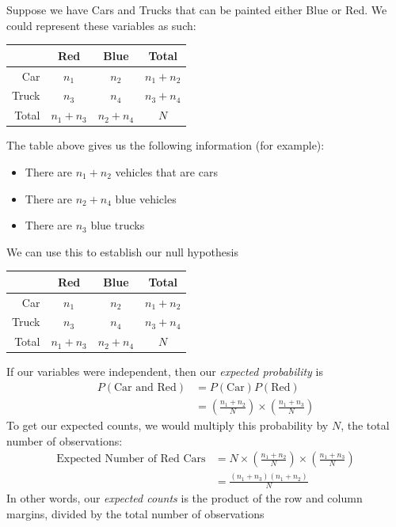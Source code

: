 \documentclass{beamer}
\begin{document}
\begin{frame}
Suppose we have Cars and Trucks that can be painted either Blue or Red. We could represent these variables as such:
\begin{table}[ht]
\centering
\begin{tabular}{rcc|c}
  \hline
 & Red & Blue & Total\\
  \hline
Car & $n_1$ & $n_2$ &  $n_1+n_2$ \\ 
Truck & $n_3$ &  $n_4$ & $n_3+n_4$ \\ 
   \hline
Total & $n_1 + n_3$ & $n_2 + n_4$ & $N$ \\ \hline
\end{tabular}
\end{table}
The table above gives us the following information (for example):
\begin{itemize}
\item There are $n_1 + n_2$ vehicles that are cars
\item There are $n_2+n_4$ blue vehicles
\item There are $n_3$ blue trucks
\end{itemize}
We can use this to establish our null hypothesis
\end{frame}


\begin{frame}
\begin{table}[ht]
\centering
\begin{tabular}{rcc|c}
  \hline
 & Red & Blue & Total\\
  \hline
Car & $n_1$ & $n_2$ &  $n_1+n_2$ \\ 
Truck & $n_3$ &  $n_4$ & $n_3+n_4$ \\ 
   \hline
Total & $n_1 + n_3$ & $n_2 + n_4$ & $N$ \\ \hline
\end{tabular}
\end{table}
If our variables were independent, then our \textit{expected probability} is
\begin{align*}
P(\text{Car and Red}) &= P(\text{Car})P(\text{Red}) \\
&= \left(\frac{n_1 + n_2}{N} \right) \times \left(\frac{n_1 + n_3}{N} \right) 
\end{align*}
To get our expected counts, we would multiply this probability by $N$, the total number of observations:
\begin{align*}
\text{Expected Number of Red Cars} &= N \times  \left(\frac{n_1 + n_2}{N} \right) \times \left(\frac{n_1 + n_3}{N} \right) \\
&= \frac{(n_1 + n_3)(n_1 + n_2)}{N} 
\end{align*}
In other words, our \textit{expected counts} is the product of the row and column margins, divided by the total number of observations
\end{frame}
\end{document}
